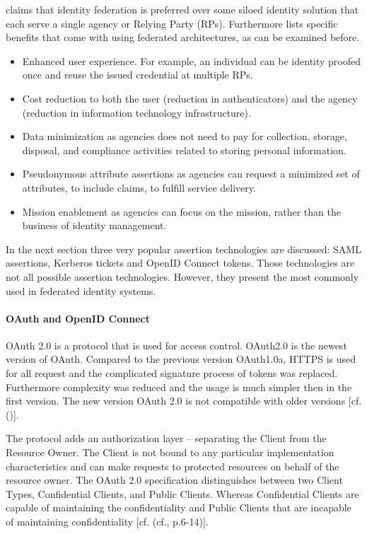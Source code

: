 {	
	\cite{NIST:2017:DIG} claims that identity federation is preferred over some siloed identity solution that each serve a single agency or Relying Party (RPs). Furthermore \cite{NIST:2017:DIG} lists specific benefits that come with using federated architectures, as can be examined before. 
	
	\begin{itemize}
		\item Enhanced user experience. For example, an individual can be identity proofed once and reuse the issued credential at multiple RPs. 
		\item Cost reduction to both the user (reduction in authenticators) and the agency (reduction in information technology infrastructure). 
		\item Data minimization as agencies does not need to pay for collection, storage, disposal, and compliance activities related to storing personal information. 
		\item Pseudonymous attribute assertions as agencies can request a minimized set of attributes, to include claims, to fulfill service delivery. 
		\item Mission enablement as agencies can focus on the mission, rather than the business of identity management.
	\end{itemize}
	
	In the next section three very popular assertion technologies are discussed: SAML assertions, Kerberos tickets and OpenID Connect tokens. Those technologies are not all possible assertion technologies. However, they present the most commonly used in federated identity systems. 
	
\paragraph{OAuth and OpenID Connect}


OAuth 2.0 is a protocol that is used for access control. OAuth2.0 is the newest version of  OAuth. Compared to the previous version OAuth1.0a, HTTPS is used for all request and the complicated signature process of tokens was replaced. Furthermore complexity was reduced and the usage is much simpler then in the first version. The new version OAuth 2.0 is not compatible with older versions [cf. (\cite{LeBlanc:2011:SocialApplications})].

The protocol adds an authorization layer – separating the Client from the Resource Owner. 
The Client is not bound to any particular implementation characteristics and can make requests to protected resources on behalf of the resource owner. The OAuth 2.0 specification distinguishes between two Client Types, Confidential Clients, and Public Clients. Whereas Confidential Clients are capable of maintaining the confidentiality and Public Clients that are incapable of maintaining confidentiality [cf. (cf.\cite{Hardt:2012:OAuth2}, p.6-14)].

}
